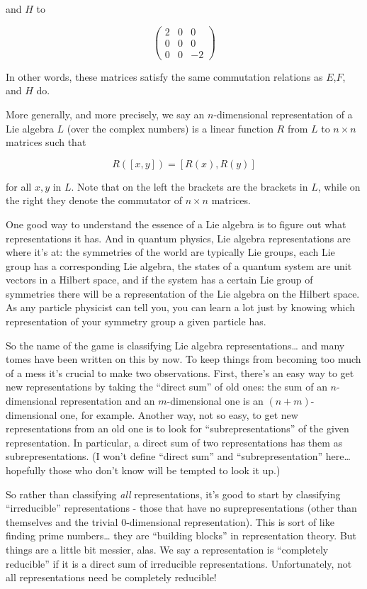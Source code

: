 \documentclass{article}
\begin{document}
and \(H\) to

\[\left(\begin{array}{ccc}2&0&0\\0&0&0\\0&0&-2\end{array}\right)\]

In other words, these matrices satisfy the same commutation relations as
\(E\),\(F\), and \(H\) do.

More generally, and more precisely, we say an \(n\)-dimensional
representation of a Lie algebra \(L\) (over the complex numbers) is a
linear function \(R\) from \(L\) to \(n\times n\) matrices such that

\[R([x,y]) = [R(x),R(y)]\]

for all \(x,y\) in \(L\). Note that on the left the brackets are the
brackets in \(L\), while on the right they denote the commutator of
\(n\times n\) matrices.

One good way to understand the essence of a Lie algebra is to figure out
what representations it has. And in quantum physics, Lie algebra
representations are where it's at: the symmetries of the world are
typically Lie groups, each Lie group has a corresponding Lie algebra,
the states of a quantum system are unit vectors in a Hilbert space, and
if the system has a certain Lie group of symmetries there will be a
representation of the Lie algebra on the Hilbert space. As any particle
physicist can tell you, you can learn a lot just by knowing which
representation of your symmetry group a given particle has.

So the name of the game is classifying Lie algebra
representations\ldots{} and many tomes have been written on this by now.
To keep things from becoming too much of a mess it's crucial to make two
observations. First, there's an easy way to get new representations by
taking the ``direct sum'' of old ones: the sum of an \(n\)-dimensional
representation and an \(m\)-dimensional one is an \((n+m)\)-dimensional
one, for example. Another way, not so easy, to get new representations
from an old one is to look for ``subrepresentations'' of the given
representation. In particular, a direct sum of two representations has
them as subrepresentations. (I won't define ``direct sum'' and
``subrepresentation'' here\ldots{} hopefully those who don't know will
be tempted to look it up.)

So rather than classifying \emph{all} representations, it's good to
start by classifying ``irreducible'' representations - those that have
no suprepresentations (other than themselves and the trivial
0-dimensional representation). This is sort of like finding prime
numbers\ldots{} they are ``building blocks'' in representation theory.
But things are a little bit messier, alas. We say a representation is
``completely reducible'' if it is a direct sum of irreducible
representations. Unfortunately, not all representations need be
completely reducible!
\end{document}
